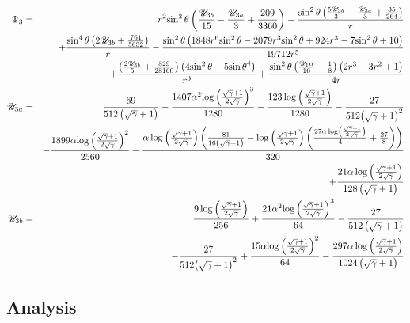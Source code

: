 \begin{eqnarray*}
\Psi_3 &=&
r^2 {\sin^2\theta} \left(\frac{{\mathscr{U}_{3b}}}{15} - \frac{{\mathscr{U}_{3a}}}{3} + \frac{209}{3360}\right) 
 - \frac{{\sin^2\theta} \left(\frac{5 {\mathscr{U}_{3b}}}{3} - \frac{{\mathscr{U}_{3a}}}{3} + \frac{35}{264}\right)}{r}
\\ && + \frac{{\sin^4\theta} \left(2 {\mathscr{U}_{3b}} + \frac{761}{5632}\right)}{r} - \frac{{\sin^2\theta} \left(1848 r^6 {\sin^2\theta} - 2079 r^3 {\sin^2\theta} + 924 r^3 - 7 {\sin^2\theta} + 10\right)}{19712 r^5} 
\\ && + \frac{\left(\frac{2 {\mathscr{U}_{3b}}}{5} + \frac{829}{28160}\right) \left(4 {\sin^2\theta} - 5 {\sin\theta}^4\right)}{r^3} + \frac{{\sin^2\theta} \left(\frac{{\mathscr{U}_1}\alpha}{16} - \frac{1}{8}\right) \left(2 r^3 - 3 r^2 + 1\right)}{4 r}
\\
\mathscr{U}_{3a} &=& \frac{69}{512 \left(\sqrt{\gamma} + 1\right)} - \frac{1407\alpha^2 {\log\left(\frac{\sqrt{\gamma} + 1}{2 \sqrt{\gamma}}\right)}^3}{1280} - \frac{123 \log\left(\frac{\sqrt{\gamma} + 1}{2 \sqrt{\gamma}}\right)}{1280} - \frac{27}{512 {\left(\sqrt{\gamma} + 1\right)}^2} \\ && -
\frac{1899\alpha {\log\left(\frac{\sqrt{\gamma} + 1}{2 \sqrt{\gamma}}\right)}^2}{2560} - \frac{\alpha \log\left(\frac{\sqrt{\gamma} + 1}{2 \sqrt{\gamma}}\right) \left(\frac{81}{16 \left(\sqrt{\gamma} + 1\right)} - \log\left(\frac{\sqrt{\gamma} + 1}{2 \sqrt{\gamma}}\right) \left(\frac{27\alpha \log\left(\frac{\sqrt{\gamma} + 1}{2 \sqrt{\gamma}}\right)}{4} + \frac{27}{8}\right)\right)}{320} \\ && + 
\frac{21\alpha \log\left(\frac{\sqrt{\gamma} + 1}{2 \sqrt{\gamma}}\right)}{128 \left(\sqrt{\gamma} + 1\right)}
\\
\mathscr{U}_{3b} &=& \frac{9 \log\left(\frac{\sqrt{\gamma} + 1}{2 \sqrt{\gamma}}\right)}{256} + \frac{21\alpha^2 {\log\left(\frac{\sqrt{\gamma} + 1}{2 \sqrt{\gamma}}\right)}^3}{64} - \frac{27}{512 \left(\sqrt{\gamma} + 1\right)} 
\\ && 
- \frac{27}{512 {\left(\sqrt{\gamma} + 1\right)}^2} + \frac{15\alpha {\log\left(\frac{\sqrt{\gamma} + 1}{2 \sqrt{\gamma}}\right)}^2}{64} 
- \frac{297\alpha \log\left(\frac{\sqrt{\gamma} + 1}{2 \sqrt{\gamma}}\right)}{1024 \left(\sqrt{\gamma} + 1\right)}
\end{eqnarray*}

\subsection{Analysis}

